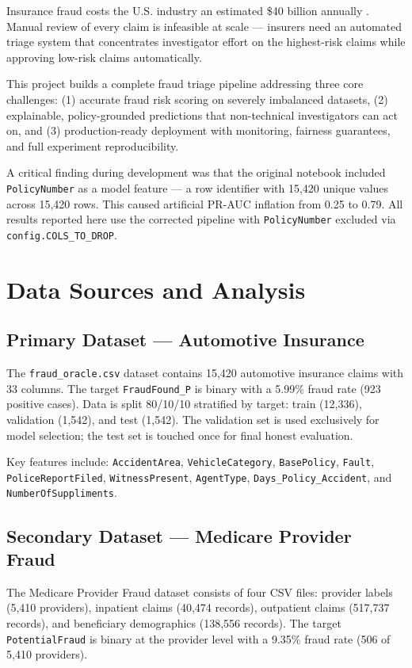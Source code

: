 \documentclass[10pt,twocolumn]{article}
\begin{document}
Insurance fraud costs the U.S. industry an estimated \$40 billion annually \cite{fbi}. Manual review of every claim is infeasible at scale --- insurers need an automated triage system that concentrates investigator effort on the highest-risk claims while approving low-risk claims automatically.

This project builds a complete fraud triage pipeline addressing three core challenges: (1) accurate fraud risk scoring on severely imbalanced datasets, (2) explainable, policy-grounded predictions that non-technical investigators can act on, and (3) production-ready deployment with monitoring, fairness guarantees, and full experiment reproducibility.

A critical finding during development was that the original notebook included \texttt{PolicyNumber} as a model feature --- a row identifier with 15,420 unique values across 15,420 rows. This caused artificial PR-AUC inflation from 0.25 to 0.79. All results reported here use the corrected pipeline with \texttt{PolicyNumber} excluded via \texttt{config.COLS\_TO\_DROP}.

\section{Data Sources and Analysis}

\subsection{Primary Dataset --- Automotive Insurance}
The \texttt{fraud\_oracle.csv} dataset \cite{kaggle} contains 15,420 automotive insurance claims with 33 columns. The target \texttt{FraudFound\_P} is binary with a 5.99\% fraud rate (923 positive cases). Data is split 80/10/10 stratified by target: train (12,336), validation (1,542), and test (1,542). The validation set is used exclusively for model selection; the test set is touched once for final honest evaluation.

Key features include: \texttt{AccidentArea}, \texttt{VehicleCategory}, \texttt{BasePolicy}, \texttt{Fault}, \texttt{PoliceReportFiled}, \texttt{WitnessPresent}, \texttt{AgentType}, \texttt{Days\_Policy\_Accident}, and \texttt{NumberOfSuppliments}.

\subsection{Secondary Dataset --- Medicare Provider Fraud}
The Medicare Provider Fraud dataset \cite{medicare} consists of four CSV files: provider labels (5,410 providers), inpatient claims (40,474 records), outpatient claims (517,737 records), and beneficiary demographics (138,556 records). The target \texttt{PotentialFraud} is binary at the provider level with a 9.35\% fraud rate (506 of 5,410 providers).
\end{document}
